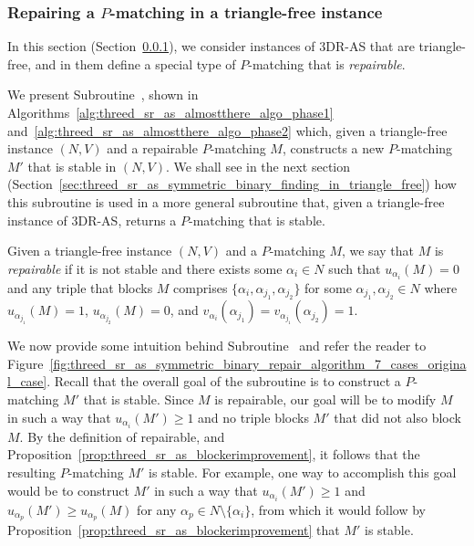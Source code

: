 \subsubsection{Repairing a \texorpdfstring{$P$}{P}-matching in a triangle-free instance}
\label{sec:threed_sr_as_symmetric_binary_repairing}

In this section (Section~\ref{sec:threed_sr_as_symmetric_binary_repairing}), we consider instances of 3DR-AS that are triangle-free, and in them define a special type of $P$\nobreakdash-matching that is \emph{repairable}. 

We present Subroutine~, shown in Algorithms~\ref{alg:threed_sr_as_almostthere_algo_phase1} and~\ref{alg:threed_sr_as_almostthere_algo_phase2} which, given a triangle-free instance $(N, V)$ and a repairable $P$\nobreakdash-matching $M$, constructs a new $P$\nobreakdash-matching $M'$ that is stable in $(N, V)$. We shall see in the next section (Section~\ref{sec:threed_sr_as_symmetric_binary_finding_in_triangle_free}) how this subroutine is used in a more general subroutine that, given a triangle-free instance of 3DR-AS, returns a $P$\nobreakdash-matching that is stable.

Given a triangle-free instance $(N, V)$ and a $P$\nobreakdash-matching $M$, we say that $M$ is \emph{repairable} if it is not stable and there exists some $\alpha_i \in N$ such that $u_{\alpha_i}(M)=0$ and any triple that blocks $M$ comprises $\{ \alpha_i, \alpha_{j_1}, \alpha_{j_2}\}$ for some $\alpha_{j_1}, \alpha_{j_2}\in N$ where $u_{\alpha_{j_1}}(M)=1$, $u_{\alpha_{j_2}}(M)=0$, and $v_{\alpha_i}(\alpha_{j_1})=v_{\alpha_{j_1}}(\alpha_{j_2})=1$.

We now provide some intuition behind Subroutine~ and refer the reader to Figure~\ref{fig:threed_sr_as_symmetric_binary_repair_algorithm_7_cases_original_case}. Recall that the overall goal of the subroutine is to construct a $P$\nobreakdash-matching $M'$ that is stable. Since $M$ is repairable, our goal will be to modify $M$ in such a way that $u_{\alpha_i}(M')\geq 1$ and no triple blocks $M'$ that did not also block $M$. By the definition of repairable, and Proposition~\ref{prop:threed_sr_as_blockerimprovement}, it follows that the resulting $P$\nobreakdash-matching $M'$ is stable. For example, one way to accomplish this goal would be to construct $M'$ in such a way that $u_{\alpha_i}(M')\geq 1$ and $u_{\alpha_p}(M')\geq u_{\alpha_p}(M)$ for any $\alpha_p \in N\setminus \{ \alpha_i \}$, from which it would follow by Proposition~\ref{prop:threed_sr_as_blockerimprovement} that $M'$ is stable.

